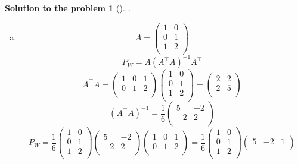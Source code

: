 \documentclass[12pt,a4]{article}
\newtheorem{solution}{Solution to the problem}
\newcommand{\ba}{{\mathbf a}}
\begin{document}
\begin{solution}[]\rm .
\begin{enumerate}[(a)]
\item
\[
A = 
\begin{pmatrix}
1 & 0 \\
0 & 1 \\
1 & 2 \\
\end{pmatrix}
\]
\[
P_W = A (A^\top A)^{-1} A^\top
\]
\[
A^\top A =
\begin{pmatrix}
1 & 0 & 1\\
0 & 1 & 2 \\
\end{pmatrix}
\begin{pmatrix}
1 & 0 \\
0 & 1 \\
1 & 2 \\
\end{pmatrix}
=
\begin{pmatrix}
2 & 2 \\
2 & 5 \\
\end{pmatrix}
\]
\[
(A^\top A)^{-1} = \frac{1}{6}
\begin{pmatrix}
5 & -2 \\
-2 & 2 \\
\end{pmatrix}
\]
\[
P_W = \frac{1}{6}
\begin{pmatrix}
1 & 0 \\
0 & 1 \\
1 & 2 \\
\end{pmatrix}
\begin{pmatrix}
5 & -2 \\
-2 & 2 \\
\end{pmatrix}
\begin{pmatrix}
1 & 0 & 1\\
0 & 1 & 2 \\
\end{pmatrix}
= \frac{1}{6}
\begin{pmatrix}
1 & 0 \\
0 & 1 \\
1 & 2 \\
\end{pmatrix}
\begin{pmatrix}
5 & -2 & 1\\

\end{pmatrix}\]
\end{enumerate}
\end{solution}
\end{document}
